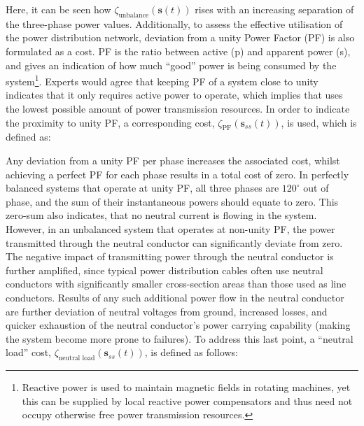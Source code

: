 


Here, it can be seen how $\zeta_\text{unbalance}(\textbf{s}(t))$ rises with an increasing separation of the three-phase power values.
Additionally, to assess the effective utilisation of the power distribution network, deviation from a unity Power Factor (PF) is also formulated as a cost.
PF is the ratio between active (p) and apparent power (s), and gives an indication of how much ``good'' power is being consumed by the system\footnote{Reactive power is used to maintain magnetic fields in rotating machines, yet this can be supplied by local reactive power compensators and thus need not occupy otherwise free power transmission resources.}.
Experts would agree that keeping PF of a system close to unity indicates that it only requires active power to operate, which implies that uses the lowest possible amount of power transmission resources.
In order to indicate the proximity to unity PF, a corresponding cost, $\zeta_\text{PF}(\textbf{s}_{ss}(t))$, is used, which is defined as:




Any deviation from a unity PF per phase increases the associated cost, whilst achieving a perfect PF for each phase results in a total cost of zero.
In perfectly balanced systems that operate at unity PF, all three phases are $120^\circ$ out of phase, and the sum of their instantaneous powers should equate to zero.
This zero-sum also indicates, that no neutral current is flowing in the system.
However, in an unbalanced system that operates at non-unity PF, the power transmitted through the neutral conductor can significantly deviate from zero.
The negative impact of transmitting power through the neutral conductor is further amplified, since typical power distribution cables often use neutral conductors with significantly smaller cross-section areas than those used as line conductors.
Results of any such additional power flow in the neutral conductor are further deviation of neutral voltages from ground, increased losses, and quicker exhaustion of the neutral conductor's power carrying capability (making the system become more prone to failures).
To address this last point, a ``neutral load'' cost, $\zeta_\text{neutral load}(\textbf{s}_{ss}(t))$, is defined as follows:


